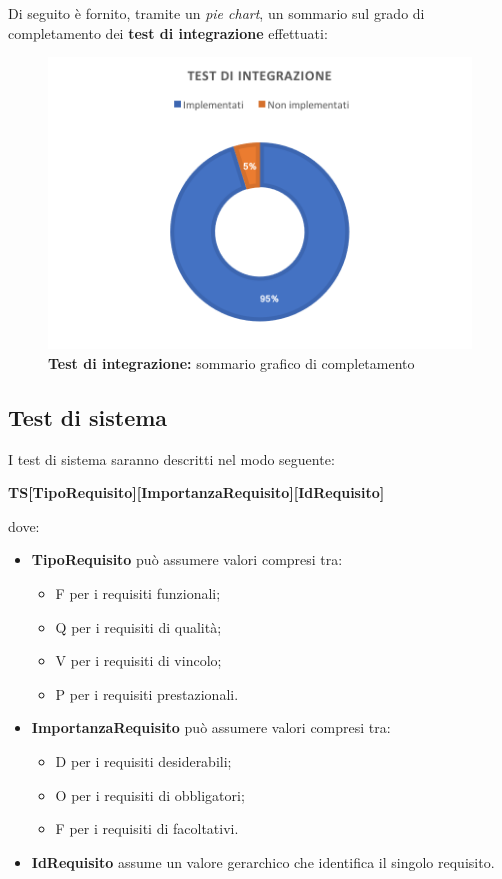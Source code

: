 \documentclass[../PianoDiQualifica_v4.0.0.tex]{subfiles}
\begin{document}
		Di seguito è fornito, tramite un \textit{pie chart}, un sommario sul grado di completamento dei \textbf{test di integrazione} effettuati:

		\begin{figure}[!h]
			\centering
			\includegraphics{ImgTest/TI.png}
			\caption{\textbf{Test di integrazione:} sommario grafico di completamento}
			\label{fig:pieTI}
		\end{figure}

	\newpage
	\newpage
	\subsection{Test di sistema}
	I test di sistema saranno descritti nel modo seguente:
	\begin{center}
		\textbf{TS[TipoRequisito][ImportanzaRequisito][IdRequisito]}
	\end{center}
	dove:
	\begin{itemize}
		\item \textbf{TipoRequisito} può assumere valori compresi tra:
		\begin{itemize}
			\item F per i requisiti funzionali;
			\item Q per i requisiti di qualità;
			\item V per i requisiti di vincolo;
			\item P per i requisiti prestazionali.
		\end{itemize}
		\item \textbf{ImportanzaRequisito} può assumere valori compresi tra:
		\begin{itemize}
			\item D per i requisiti desiderabili;
			\item O per i requisiti di obbligatori;
			\item F per i requisiti di facoltativi.
		\end{itemize}
		\item \textbf{IdRequisito} assume un valore gerarchico che identifica il singolo requisito.
	\end{itemize}
\end{document}
